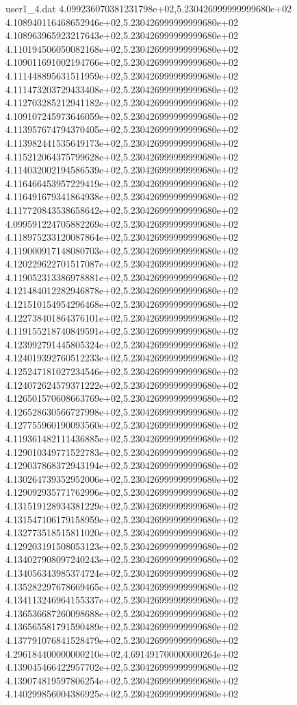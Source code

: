 \begin{filecontents}{user1_4.dat}
4.099236070381231798e+02,5.230426999999999680e+02
4.108940116468652946e+02,5.230426999999999680e+02
4.108963965923217643e+02,5.230426999999999680e+02
4.110194506050082168e+02,5.230426999999999680e+02
4.109011691002194766e+02,5.230426999999999680e+02
4.111448895631511959e+02,5.230426999999999680e+02
4.111473203729433408e+02,5.230426999999999680e+02
4.112703285212941182e+02,5.230426999999999680e+02
4.109107245973646059e+02,5.230426999999999680e+02
4.113957674794370405e+02,5.230426999999999680e+02
4.113982441535649173e+02,5.230426999999999680e+02
4.115212064375799628e+02,5.230426999999999680e+02
4.114032002194586539e+02,5.230426999999999680e+02
4.116466453957229419e+02,5.230426999999999680e+02
4.116491679341864938e+02,5.230426999999999680e+02
4.117720843538658642e+02,5.230426999999999680e+02
4.099591224705882269e+02,5.230426999999999680e+02
4.118975233120087864e+02,5.230426999999999680e+02
4.119000917148080703e+02,5.230426999999999680e+02
4.120229622701517087e+02,5.230426999999999680e+02
4.119052313386978881e+02,5.230426999999999680e+02
4.121484012282946878e+02,5.230426999999999680e+02
4.121510154954296468e+02,5.230426999999999680e+02
4.122738401864376101e+02,5.230426999999999680e+02
4.119155218740849591e+02,5.230426999999999680e+02
4.123992791445805324e+02,5.230426999999999680e+02
4.124019392760512233e+02,5.230426999999999680e+02
4.125247181027234546e+02,5.230426999999999680e+02
4.124072624579371222e+02,5.230426999999999680e+02
4.126501570608663769e+02,5.230426999999999680e+02
4.126528630566727998e+02,5.230426999999999680e+02
4.127755960190093560e+02,5.230426999999999680e+02
4.119361482111436885e+02,5.230426999999999680e+02
4.129010349771522783e+02,5.230426999999999680e+02
4.129037868372943194e+02,5.230426999999999680e+02
4.130264739352952006e+02,5.230426999999999680e+02
4.129092935771762996e+02,5.230426999999999680e+02
4.131519128934381229e+02,5.230426999999999680e+02
4.131547106179158959e+02,5.230426999999999680e+02
4.132773518515811020e+02,5.230426999999999680e+02
4.129203191508053123e+02,5.230426999999999680e+02
4.134027908097240243e+02,5.230426999999999680e+02
4.134056343985374724e+02,5.230426999999999680e+02
4.135282297678669465e+02,5.230426999999999680e+02
4.134113246964155337e+02,5.230426999999999680e+02
4.136536687260098688e+02,5.230426999999999680e+02
4.136565581791590489e+02,5.230426999999999680e+02
4.137791076841528479e+02,5.230426999999999680e+02
4.296184400000000210e+02,4.691491700000000264e+02
4.139045466422957702e+02,5.230426999999999680e+02
4.139074819597806254e+02,5.230426999999999680e+02
4.140299856004386925e+02,5.230426999999999680e+02

\end{filecontents}
